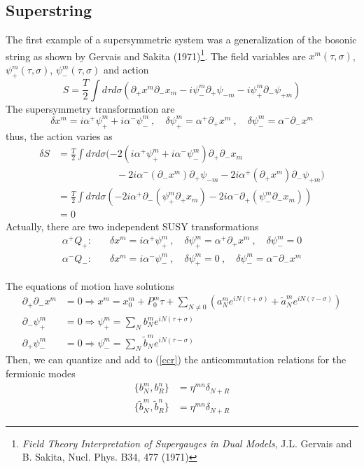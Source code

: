 \documentclass[a4paper,12pt]{article}
\numberwithin{equation}{section}
\numberwithin{exe}{section}
\newcommand{\p}{{\partial}}
\newcommand{\at}{{\tilde a}}
\renewcommand{\a}{{\alpha}}
\renewcommand{\d}{{\delta}}
\newcommand{\s}{{\sigma}}
\begin{document}
\subsection{Superstring}
The first example of a supersymmetric system was a generalization of the bosonic string as shown by Gervais and Sakita (1971)\footnote{ {\it Field Theory Interpretation of Supergauges in Dual Models}, J.L. Gervais and B. Sakita, Nucl. Phys. B34, 477 (1971)}.%
The field variables are $x^m(\tau,\s)$, $\psi^m_+(\tau,\s)$, $\psi^m_-(\tau,\s)$ and action
	\begin{equation}
	S = \frac{T}{2}\int d\tau d\s (\p_+ x^m \p_- x_m - i\psi^m_-\p_+\psi_{-m} -i\psi^m_+\p_-\psi_{+m})
	\end{equation}
The supersymmetry transformation are
	\begin{equation}
	\d x^m = i\a^+\psi^m_+ + i\a^-\psi^m_-\ ,\quad \d\psi^m_+ = \a^+\p_+x^m\ ,\quad\d\psi^m_- = \a^-\p_-x^m
	\end{equation}
thus, the action varies as
	\begin{align}
	\d S & = \frac{T}{2} \int d\tau d\s ( -2(i\a^+\psi^m_+ + i\a^-\psi^m_-)\p_+\p_-x_m \nonumber \\
	& \qquad\qquad\qquad -2i\a^-(\p_-x^m)\p_+\psi_{-m} -2i\a^+(\p_+x^m)\p_-\psi_{+m} ) \nonumber \\
	& = \frac{T}{2} \int d\tau d\s ( -2i\a^+\p_-(\psi^m_+ \p_+ x_m) -2i\a^- \p_+ (\psi^m_- \p_- x_m) ) \nonumber \\
	& = 0
	\end{align}
Actually, there are two independent SUSY transformations
	\begin{align}
	\a^+ Q_+ :&\quad\d x^m=i\a^+\psi^m_+\ ,\quad \d\psi^m_+ = \a^+\p_+ x^m\ ,\quad \d\psi^m_- = 0 \\
	\a^- Q_- :&\quad\d x^m=i\a^-\psi^m_-\ ,\quad \d\psi^m_+ = 0 \ ,\quad \d\psi^m_- = \a^-\p_- x^m
	\end{align}

The equations of motion have solutions
	\begin{align}
	\p_+\p_- x^m & = 0 \Rightarrow x^m = x^m_0 + P^m_0 \tau + \sum_{N\neq 0} (a^m_N e^{iN(\tau+\s)} + \at^m_N e^{iN(\tau-\s)})  \\
	\p_-\psi^m_+ & = 0 \Rightarrow \psi^m_+ = \sum_N b^m_N e^{iN(\tau +\s)} \\
	\p_+\psi^m_- & = 0 \Rightarrow \psi^m_- = \sum_N {\tilde b}^m_N e^{iN(\tau-\s)}
	\end{align}
Then, we can quantize and add to (\ref{ccr}) the anticommutation relations for the fermionic modes
	\begin{align}
	\{b^m_N, b^n_R\} & = \eta^{mn} \d_{N+R} \\
	\{ {\tilde b}^m_N, {\tilde b}^n_R \} & = \eta^{mn} \d_{N+R}
	\end{align}
\end{document}
